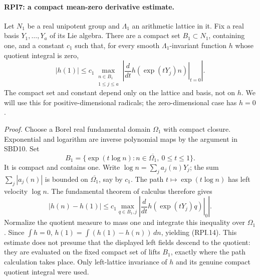 \paragraph{RPI7: a compact mean-zero derivative estimate.}
\label{claim:RPI7}
Let \(N_1\) be a real unipotent group and \(\Lambda_1\) an
arithmetic lattice in it.  Fix a real basis \(Y_1,\ldots,Y_a\)
of its Lie algebra.  There are a compact set
\(B_1\subset N_1\), containing one, and a constant \(c_1\)
such that, for every smooth \(\Lambda_1\)-invariant function
\(h\) whose quotient integral is zero,
\[
 |h(1)|\le c_1
       \max_{\substack{n\in B_1\\1\le j\le a}}
       \left|\left.\frac{d}{dt}h(\exp(tY_j)n)
                                                   \right|_{t=0}\right|.
 \tag{RPI.14}
\]
The compact set and constant depend only on the lattice and
basis, not on \(h\).  We will use this for positive-dimensional
radicals; the zero-dimensional case has \(h=0\).

\emph{Proof.}
Choose a Borel real fundamental domain \(\Omega_1\) with
compact closure.  Exponential and logarithm are inverse
polynomial maps by the argument in SBD10.  Set
\[
 B_1=\{\exp(t\log n):n\in\overline{\Omega_1},\ 0\le t\le1\}.
 \tag{RPI.15}
\]
It is compact and contains one.  Write
\(\log n=\sum_j a_j(n)Y_j\); the sum
\(\sum_j|a_j(n)|\) is bounded on \(\overline{\Omega_1}\),
say by \(c_1\).  The path \(t\mapsto\exp(t\log n)\)
has left velocity \(\log n\).  The fundamental theorem
of calculus therefore gives
\[
 |h(n)-h(1)|
 \le c_1\max_{q\in B_1,j}
       \left|\left.\frac{d}{dt}h(\exp(tY_j)q)\right|_{0}\right|.
 \tag{RPI.16}
\]
Normalize the quotient measure to mass one and integrate this
inequality over \(\Omega_1\).  Since \(\int h=0\),
\(h(1)=\int(h(1)-h(n))\,dn\), yielding (RPI.14).
This estimate does not presume that the displayed left fields
descend to the quotient: they are evaluated on the fixed compact
set of lifts \(B_1\), exactly where the path calculation takes
place.  Only left-lattice invariance of \(h\) and its genuine
compact quotient integral were used.

